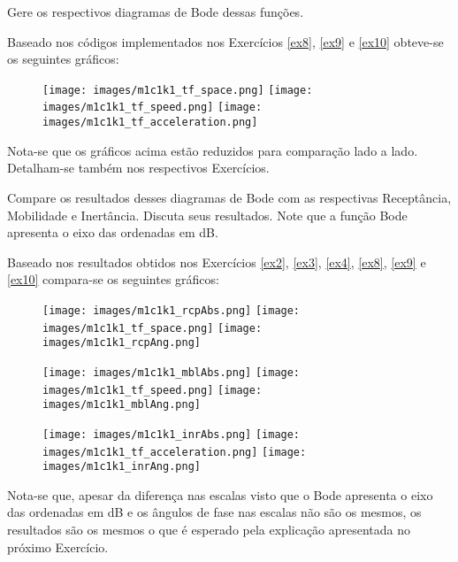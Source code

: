 \documentclass{article}
\begin{document}
\newpage
\begin{exercise}\label{ex11}
    Gere os respectivos diagramas de Bode dessas funções.
\end{exercise}
\begin{resolution}
    Baseado nos códigos implementados nos Exercícios \ref{ex8}, \ref{ex9} e \ref{ex10} obteve-se os seguintes gráficos:
    \begin{figure}[H]
        \centering
        \texttt{[image: images/m1c1k1\_tf\_space.png]}
        \texttt{[image: images/m1c1k1\_tf\_speed.png]}
        \texttt{[image: images/m1c1k1\_tf\_acceleration.png]}
    \end{figure}
    Nota-se que os gráficos acima estão reduzidos para comparação lado a lado. Detalham-se também nos respectivos Exercícios. 
\end{resolution}

\newpage
\begin{exercise}\label{ex12}
    Compare os resultados desses diagramas de Bode com as respectivas Receptância, Mobilidade e Inertância. Discuta seus resultados. Note que a função Bode apresenta o eixo das ordenadas em dB. 
\end{exercise}
\begin{resolution}
    Baseado nos resultados obtidos nos Exercícios \ref{ex2}, \ref{ex3}, \ref{ex4}, \ref{ex8}, \ref{ex9} e \ref{ex10} compara-se os seguintes gráficos: 
    \begin{figure}[H]
        \centering
        \texttt{[image: images/m1c1k1\_rcpAbs.png]}
        \texttt{[image: images/m1c1k1\_tf\_space.png]}
        \texttt{[image: images/m1c1k1\_rcpAng.png]}
    \end{figure}
    \begin{figure}[H]
        \centering
        \texttt{[image: images/m1c1k1\_mblAbs.png]}
        \texttt{[image: images/m1c1k1\_tf\_speed.png]}
        \texttt{[image: images/m1c1k1\_mblAng.png]}
    \end{figure}
    \begin{figure}[H]
        \centering
        \texttt{[image: images/m1c1k1\_inrAbs.png]}
        \texttt{[image: images/m1c1k1\_tf\_acceleration.png]}
        \texttt{[image: images/m1c1k1\_inrAng.png]}
    \end{figure}
    Nota-se que, apesar da diferença nas escalas visto que o Bode apresenta o eixo das ordenadas em dB e os ângulos de fase nas escalas não são os mesmos, os resultados são os mesmos o que é esperado pela explicação apresentada no próximo Exercício.
\end{resolution}
\end{document}
